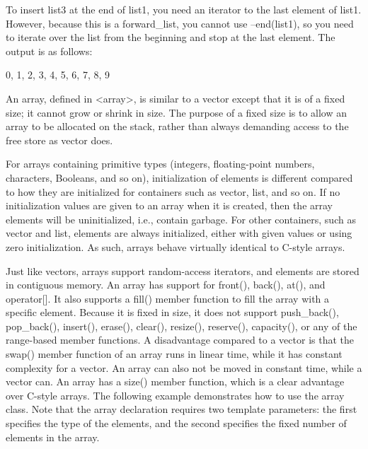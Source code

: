 To insert list3 at the end of list1, you need an iterator to the last element of list1. However, because this is a forward\_list, you cannot use --end(list1), so you need to iterate over the list from the beginning and stop at the last element. The output is as follows:

\begin{shell}
0, 1, 2, 3, 4, 5, 6, 7, 8, 9
\end{shell}


An array, defined in <array>, is similar to a vector except that it is of a fixed size; it cannot grow or shrink in size. The purpose of a fixed size is to allow an array to be allocated on the stack, rather than always demanding access to the free store as vector does.

For arrays containing primitive types (integers, floating-point numbers, characters, Booleans, and so on), initialization of elements is different compared to how they are initialized for containers such as vector, list, and so on. If no initialization values are given to an array when it is created, then the array elements will be uninitialized, i.e., contain garbage. For other containers, such as vector and list, elements are always initialized, either with given values or using zero initialization. As such, arrays behave virtually identical to C-style arrays.

Just like vectors, arrays support random-access iterators, and elements are stored in contiguous memory. An array has support for front(), back(), at(), and operator[]. It also supports a fill() member function to fill the array with a specific element. Because it is fixed in size, it does not support push\_back(), pop\_back(), insert(), erase(), clear(), resize(), reserve(), capacity(), or any of the range-based member functions. A disadvantage compared to a vector is that the swap() member function of an array runs in linear time, while it has constant complexity for a vector. An array can also not be moved in constant time, while a vector can. An array has a size() member function, which is a clear advantage over C-style arrays. The following example demonstrates how to use the array class. Note that the array declaration requires two template parameters: the first specifies the type of the elements, and the second specifies the fixed number of elements in the array.

